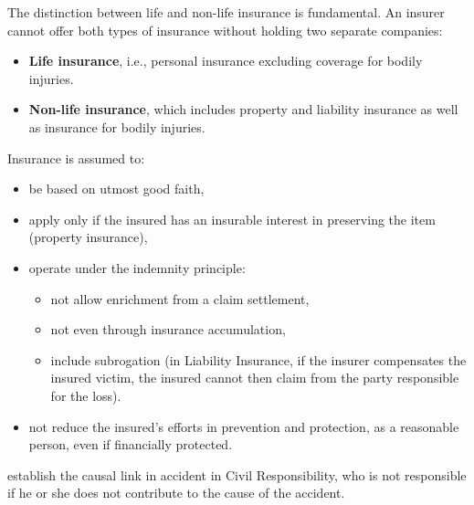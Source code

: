 \begin{f}
	
The distinction between life and non-life insurance is fundamental. An insurer cannot offer both types of insurance without holding two separate companies: 
\begin{itemize}
	\item \textbf{Life insurance}, i.e., personal insurance excluding coverage for bodily injuries.
	\item \textbf{Non-life insurance}, which includes property and liability insurance as well as insurance for bodily injuries.
\end{itemize}
\end{f}


\begin{f}
	
	
Insurance is assumed to:
	\begin{itemize}
		\item be based on utmost good faith,
		\item apply only if the insured has an insurable interest in preserving the item (property insurance),
		\item operate under the indemnity principle:
		\begin{itemize}
			\item not allow enrichment from a claim settlement,
			\item not even through insurance accumulation,
			\item include subrogation (in Liability Insurance, if the insurer compensates the insured victim, the insured cannot then claim from the party responsible for the loss).
		\end{itemize}
		\item not reduce the insured’s efforts in prevention and protection, as a reasonable person, even if financially protected.
	\end{itemize}
	\item establish the causal link in accident in Civil Responsibility, who is not responsible if he or she does not contribute to the cause of the accident.
\end{f}


